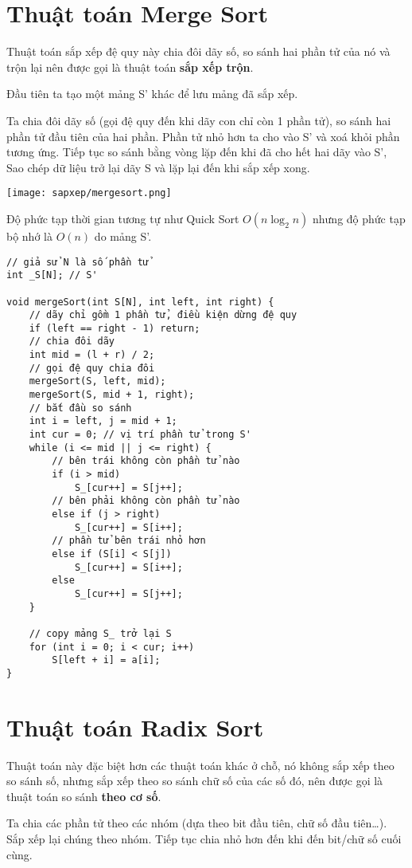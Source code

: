 \section{Thuật toán Merge Sort}
Thuật toán sắp xếp đệ quy này chia đôi dãy số, so sánh hai phần tử của nó và trộn lại nên được gọi là thuật toán \textbf{sắp xếp trộn}.

Đầu tiên ta tạo một mảng S' khác để lưu mảng đã sắp xếp.

Ta chia đôi dãy số (gọi đệ quy đến khi dãy con chỉ còn 1 phần tử), so sánh hai phần tử đầu tiên của hai phần. Phần tử nhỏ hơn ta cho vào S' và xoá khỏi phần tương ứng. Tiếp tục so sánh bằng vòng lặp đến khi đã cho hết hai dãy vào S', Sao chép dữ liệu trở lại dãy S và lặp lại đến khi sắp xếp xong.

\texttt{[image: sapxep/mergesort.png]}

Độ phức tạp thời gian tương tự như Quick Sort $O(n\log_2n)$ nhưng độ phức tạp bộ nhớ là $O(n)$ do mảng S'.

\begin{verbatim}
// giả sử N là số phần tử
int _S[N]; // S'

void mergeSort(int S[N], int left, int right) {
    // dãy chỉ gồm 1 phần tử, điều kiện dừng đệ quy
    if (left == right - 1) return;
    // chia đôi dãy
    int mid = (l + r) / 2;
    // gọi đệ quy chia đôi
    mergeSort(S, left, mid);
    mergeSort(S, mid + 1, right);
    // bắt đầu so sánh
    int i = left, j = mid + 1;
    int cur = 0; // vị trí phần tử trong S'
    while (i <= mid || j <= right) {
        // bên trái không còn phần tử nào
        if (i > mid)
            S_[cur++] = S[j++];
        // bên phải không còn phần tử nào
        else if (j > right)
            S_[cur++] = S[i++];
        // phần tử bên trái nhỏ hơn
        else if (S[i] < S[j])
            S_[cur++] = S[i++];
        else
            S_[cur++] = S[j++];
    }

    // copy mảng S_ trở lại S
    for (int i = 0; i < cur; i++)
        S[left + i] = a[i];
}
\end{verbatim}

\section{Thuật toán Radix Sort}
Thuật toán này đặc biệt hơn các thuật toán khác ở chỗ, nó không sắp xếp theo so sánh số, nhưng sắp xếp theo so sánh chữ số của các số đó, nên được gọi là thuật toán so sánh \textbf{theo cơ số}.

Ta chia các phần tử theo các nhóm (dựa theo bit đầu tiên, chữ số đầu tiên\dots). Sắp xếp lại chúng theo nhóm. Tiếp tục chia nhỏ hơn đến khi đến bit/chữ số cuối cùng.

